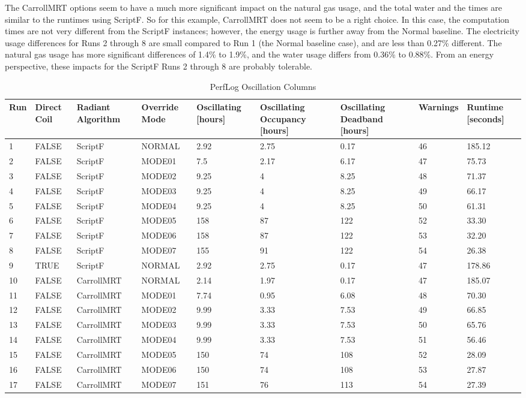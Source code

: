 The CarrollMRT options seem to have a much more significant impact on the natural gas usage, and the total water and the times are similar to the runtimes using ScriptF. So for this example, CarrollMRT does not seem to be a right choice. In this case, the computation times are not very different from the ScriptF instances; however, the energy usage is further away from the Normal baseline. The electricity usage differences for Runs 2 through 8 are small compared to Run 1 (the Normal baseline case), and are less than 0.27\% different. The natural gas usage has more significant differences of 1.4\% to 1.9\%, and the water usage differs from 0.36\% to 0.88\%. From an energy perspective, these impacts for the ScriptF Runs 2 through 8 are probably tolerable. 

{\scriptsize
\begin{longtable}[c]{p{0.2in}p{0.4in}p{0.6in}p{0.7in}p{0.5in}p{0.5in}p{0.7in}p{0.6in}p{0.65in}}
\caption{PerfLog Oscillation Columns\label{table:perflog_mode_columns}} \tabularnewline
\toprule
Run & 
Direct Coil & 
Radiant Algorithm & 
Override Mode & 
  Oscillating {[}hours{]} &
  Oscillating Occupancy {[}hours{]} &
  Oscillating Deadband {[}hours{]} &
  Warnings &
  Runtime {[}seconds{]} \tabularnewline
\midrule
\endfirsthead

1  & FALSE & ScriptF    & NORMAL & 2.92	 & 2.75	 & 0.17	 & 46 &	185.12 \tabularnewline
2  & FALSE & ScriptF    & MODE01 & 7.5	 & 2.17	 & 6.17	 & 47 &	75.73  \tabularnewline
3  & FALSE & ScriptF    & MODE02 & 9.25	 & 4	 & 8.25	 & 48 &	71.37  \tabularnewline
4  & FALSE & ScriptF    & MODE03 & 9.25	 & 4	 & 8.25	 & 49 & 66.17  \tabularnewline
5  & FALSE & ScriptF    & MODE04 & 9.25	 & 4	 & 8.25	 & 50 &	61.31  \tabularnewline
6  & FALSE & ScriptF    & MODE05 & 158	 & 87	 & 122	 & 52 &	33.30  \tabularnewline
7  & FALSE & ScriptF    & MODE06 & 158	 & 87	 & 122	 & 53 &	32.20  \tabularnewline
8  & FALSE & ScriptF    & MODE07 & 155	 & 91	 & 122	 & 54 &	26.38  \tabularnewline
9  & TRUE  & ScriptF    & NORMAL & 2.92	 & 2.75	 & 0.17	 & 47 & 178.86 \tabularnewline
10 & FALSE & CarrollMRT & NORMAL & 2.14	 & 1.97	 & 0.17	 & 47 &	185.07 \tabularnewline
11 & FALSE & CarrollMRT & MODE01 & 7.74	 & 0.95	 & 6.08	 & 48 &	70.30  \tabularnewline
12 & FALSE & CarrollMRT & MODE02 & 9.99	 & 3.33	 & 7.53	 & 49 &	66.85  \tabularnewline
13 & FALSE & CarrollMRT & MODE03 & 9.99	 & 3.33	 & 7.53	 & 50 &	65.76  \tabularnewline
14 & FALSE & CarrollMRT & MODE04 & 9.99	 & 3.33	 & 7.53	 & 51 &	56.46  \tabularnewline
15 & FALSE & CarrollMRT & MODE05 & 150	 & 74	 & 108	 & 52 &	28.09  \tabularnewline
16 & FALSE & CarrollMRT & MODE06 & 150	 & 74	 & 108	 & 53 &	27.87  \tabularnewline
17 & FALSE & CarrollMRT & MODE07 & 151	 & 76	 & 113	 & 54 &	27.39  \tabularnewline

\bottomrule
\end{longtable}
}

